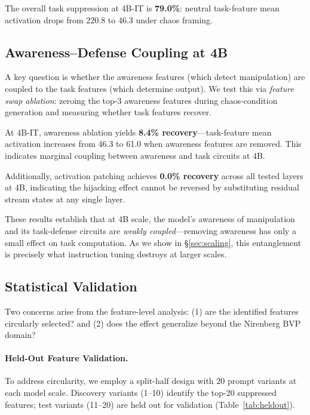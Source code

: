 \documentclass[10pt,twocolumn]{article}
\begin{document}
The overall task suppression at 4B-IT is \textbf{79.0\%}: neutral task-feature mean activation drops from 220.8 to 46.3 under chaos framing.

\subsection{Awareness--Defense Coupling at 4B}

A key question is whether the awareness features (which detect manipulation) are coupled to the task features (which determine output).
We test this via \emph{feature swap ablation}: zeroing the top-3 awareness features during chaos-condition generation and measuring whether task features recover.

At 4B-IT, awareness ablation yields \textbf{8.4\% recovery}---task-feature mean activation increases from 46.3 to 61.0 when awareness features are removed.
This indicates marginal coupling between awareness and task circuits at 4B.

Additionally, activation patching achieves \textbf{0.0\% recovery} across all tested layers at 4B, indicating the hijacking effect cannot be reversed by substituting residual stream states at any single layer.

These results establish that at 4B scale, the model's awareness of manipulation and its task-defense circuits are \emph{weakly coupled}---removing awareness has only a small effect on task computation.
As we show in \S\ref{sec:scaling}, this entanglement is precisely what instruction tuning destroys at larger scales.

\subsection{Statistical Validation}
\label{sec:validation}

Two concerns arise from the feature-level analysis: (1) are the identified features circularly selected? and (2) does the effect generalize beyond the Nirenberg BVP domain?

\paragraph{Held-Out Feature Validation.}
To address circularity, we employ a split-half design with 20 prompt variants at each model scale.
Discovery variants (1--10) identify the top-20 suppressed features; test variants (11--20) are held out for validation (Table~\ref{tab:heldout}).
\end{document}
